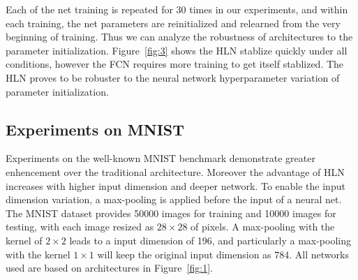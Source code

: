 \documentclass[3p,times,procedia]{elsarticle}
\begin{document}
Each of the net training is repeated for 
30 times in our experiments, and within
each training, the net parameters are
reinitialized and relearned from the
very beginning of training. Thus we
can analyze the robustness of 
architectures to the parameter
initialization.
Figure~\ref{fig:3} shows the HLN
stablize quickly under all conditions,
however the FCN requires more training
to get itself stablized. The HLN proves
to be robuster to the neural network
hyperparameter variation of parameter 
initialization.
\subsection{Experiments on MNIST}
Experiments on the well-known MNIST
benchmark demonstrate greater enhencement
over the traditional architecture.
Moreover the advantage of HLN increases 
with higher input dimension
and deeper network. 
To enable the input dimension variation,
a max-pooling is applied before the input
of a neural net. The MNIST dataset
provides 50000 images for training and 
10000 images for testing, with each image
resized as $28\times 28$ of pixels. 
A max-pooling with the kernel of 
$2\times 2$
leads to a input dimension of 196, and
particularly a max-pooling with the
kernel $1\times 1$ will keep the original
input dimension as 784. All networks used
are based on architectures in 
Figure~\ref{fig:1}.
\end{document}
